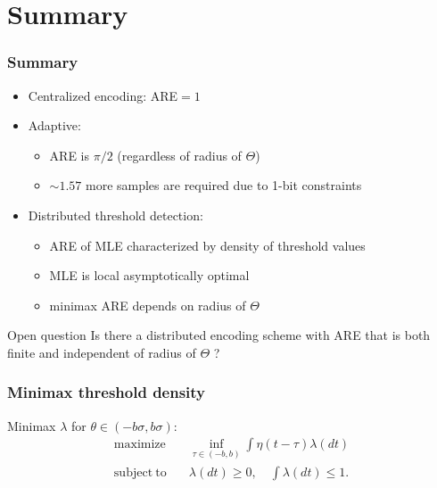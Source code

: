 \documentclass[mathserif]{beamer}
\begin{document}
\section{Summary}

\begin{frame}
\frametitle{Summary}
\begin{itemize}
\pause
\item Centralized encoding: ARE$=1$
\pause
\item Adaptive:
\begin{itemize}
\item ARE is $\pi/2$ (regardless of radius of $\Theta$)
\pause
\item $\sim 1.57$ more samples are required due to 1-bit constraints
\end{itemize}
\pause
\bigskip
\item Distributed threshold detection:
\begin{itemize}
\item ARE of MLE characterized by density of threshold values 
\pause
\item MLE is local asymptotically optimal 
\pause
\item minimax ARE depends on radius of $\Theta$
\end{itemize}
\end{itemize}

\bigskip
\pause
\begin{alertblock}{Open question}
Is there a distributed encoding scheme with ARE that is both finite and independent of radius of $\Theta$ ?
\end{alertblock}

\end{frame}



\begin{frame}
\frametitle{Minimax threshold density}

Minimax $\lambda$ for $\theta \in (-b\sigma,b\sigma)$:
\begin{align*}
\mathrm{maximize} \quad &  \inf_{\tau \in (-b,b)} \int \eta(t-\tau) \lambda(dt)
\\ \nonumber
\mathrm{subject~to} 
\quad & \lambda(dt)\geq 0,\quad \int \lambda(dt) \leq 1. 
\end{align*}

\end{frame}
\end{document}
